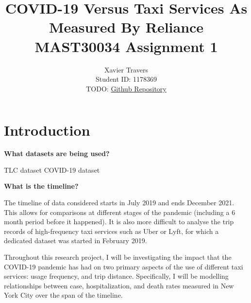 \documentclass[11pt]{article}
\title{\textbf{COVID-19 Versus Taxi Services As Measured By Reliance} \\ 
MAST30034 Assignment 1}
\author{
Xavier Travers \\
Student ID: 1178369 \\
TODO: \href{https://github.com/MAST30034-Applied-Data-Science/mast30034\_p1\_template/tree/fd9f1dd17fdbcb5b119b70c93a22da8210d44fd7}{Github Repository}
}
\begin{document}
\maketitle

\section{Introduction}

\textbf{What datasets are being used?}

TLC dataset \cite{tlcdataset}
COVID-19 dataset

\textbf{What is the timeline?}

The timeline of data considered starts in July 2019 and ends December 2021.
This allows for comparisons at different stages of the pandemic (including a 6 month period before it happened).
It is also more difficult to analyse the trip records of high-frequency taxi services such as Uber or Lyft,
for which a dedicated dataset was started in February 2019.


Throughout this research project, 
I will be investigating the impact that the COVID-19 pandemic has had on two primary aspects of the use of different taxi services:
usage frequency, and trip distance. Specifically, I will be modelling relationships between case, hospitalization, and death rates measured in New York City over the span of the timeline.




\end{document}

